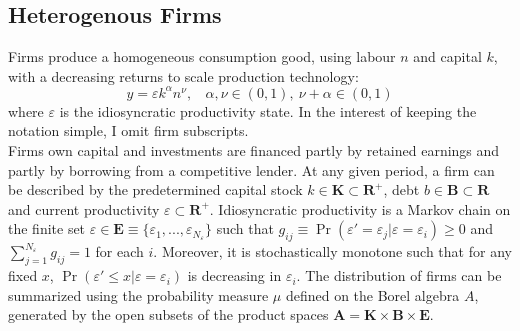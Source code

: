 \documentclass[12pt]{article}
\begin{document}
\subsection{Heterogenous Firms \label{sec:firms}}
Firms produce a homogeneous consumption good, using labour $n$ and capital $k$, with a decreasing returns to scale production technology:
\begin{equation} \label{eq:prodf}
y = \varepsilon k^{\alpha}n^{\nu}, \ \ \ \ \alpha,\nu \in (0,1),  \ \nu + \alpha \in (0,1)
\end{equation}  
where $\varepsilon$ is the idiosyncratic productivity state. In the interest of keeping the notation simple, I omit firm subscripts. \vspace{3mm} \\
Firms own capital and investments are financed partly by retained earnings and partly by borrowing from a competitive lender. At any given period, a firm can be described by the predetermined capital stock $k \in \mathbf{K} \subset \mathbf{R^{+}}$, debt $b \in \mathbf{B} \subset \mathbf{R}$ and current productivity $\varepsilon \subset \mathbf{R^+}$.  Idiosyncratic productivity is a Markov chain on the finite set $\varepsilon \in \mathbf{E} \equiv \{ \varepsilon_1,...,\varepsilon_{N_{\varepsilon}} \}$ such that $ g_{ij} \equiv \Pr(\varepsilon'= \varepsilon_j|\varepsilon = \varepsilon_i) \geq 0$ and $\sum_{j=1}^{N_{\varepsilon}} g_{ij} = 1$ for each $i$. Moreover, it is stochastically monotone such that for any fixed $x$, $\Pr(\varepsilon' \leq x | \varepsilon = \varepsilon_i)$ is decreasing in $\varepsilon_i$. The distribution of firms can be summarized using the probability measure $\mu$ defined on the Borel algebra $A$, generated by the open subsets of the product spaces $ \mathbf{A} = \mathbf{K} \times \mathbf{B} \times \mathbf{E} $.
\end{document}
